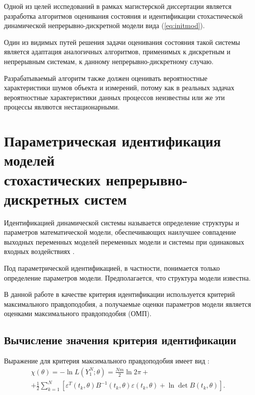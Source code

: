 \documentclass[a4paper,14pt]{extarticle}
\let\oldref\ref
\renewcommand{\ref}[1]{(\oldref{#1})}
\begin{document}
Одной из целей исспедований в рамках магистерской диссертации является
разработка алгоритмов оценивания состояния и идентификации стохастической 
динамической непрерывно-дискретной модели вида \ref{eq:initmod}. 

Один из видимых путей решения задачи оценивания состояния такой системы
является адаптация аналогичных алгоритмов, применимых к дискретным и
непрерывным системам, к данному непрерывно-дискретному случаю.

Разрабатываемый алгоритм также должен оценивать вероятностные характеристики
шумов объекта и измерений, потому как в реальных задачах вероятностные
характеристики данных процессов неизвестны или же эти процессы являются
нестационарными.

\section[Параметрическая идентификация моделей стохастических
\\непрерывно-дискретных систем]
{Параметрическая идентификация моделей \\стохастических
непрерывно-дискретных систем} 

Идентификацией динамической системы называется определение структуры и
параметров математической модели, обеспечивающих наилучшее совпадение выходных
переменных моделей переменных модели и системы при одинаковых входных
воздействиях \cite{chubich}.

Под параметрической идентификацией, в частности, понимается только определение
параметров модели. Предполагается, что структура модели известна.

В данной работе в качестве критерия идентификации используется критерий
максимального правдоподобия, а получаемые оценки параметров модели является
оценками максимального правдоподобия (ОМП).

\subsection{Вычисление значения критерия идентификации}

\newcommand{\eps}{\varepsilon}

Выражение для критерия максимального правдоподобия имеет вид \cite{denisov}:
\begin{equation}
\begin{split}
\chi(\theta) = -\ln{L(Y_1^N;\theta)} = \frac{Nm}{2} \ln{2\pi} +
\\ + \frac{1}{2} \sum\limits_{k=1}^{N} 
\left[ \eps^T(t_k, \theta) B^{-1}(t_k, \theta) \eps(t_k, \theta) + 
\ln \det B(t_k, \theta) \right].
\end{split}
\end{equation}
\end{document}
